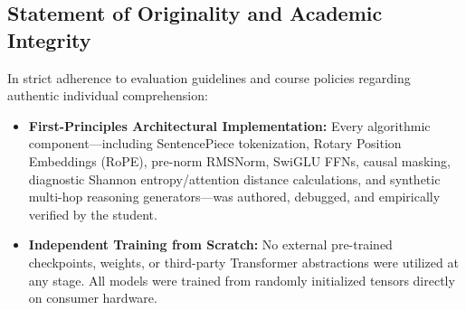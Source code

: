 \documentclass[10pt,a4paper]{article}
\begin{document}
\subsection{Statement of Originality and Academic Integrity}
In strict adherence to evaluation guidelines and course policies regarding authentic individual comprehension:
\begin{itemize}[noitemsep,leftmargin=*]
    \item \textbf{First-Principles Architectural Implementation:} Every algorithmic component---including SentencePiece tokenization, Rotary Position Embeddings (RoPE), pre-norm RMSNorm, SwiGLU FFNs, causal masking, diagnostic Shannon entropy/attention distance calculations, and synthetic multi-hop reasoning generators---was authored, debugged, and empirically verified by the student.
    \item \textbf{Independent Training from Scratch:} No external pre-trained checkpoints, weights, or third-party Transformer abstractions were utilized at any stage. All models were trained from randomly initialized tensors directly on consumer hardware.
\end{itemize}
\end{document}

